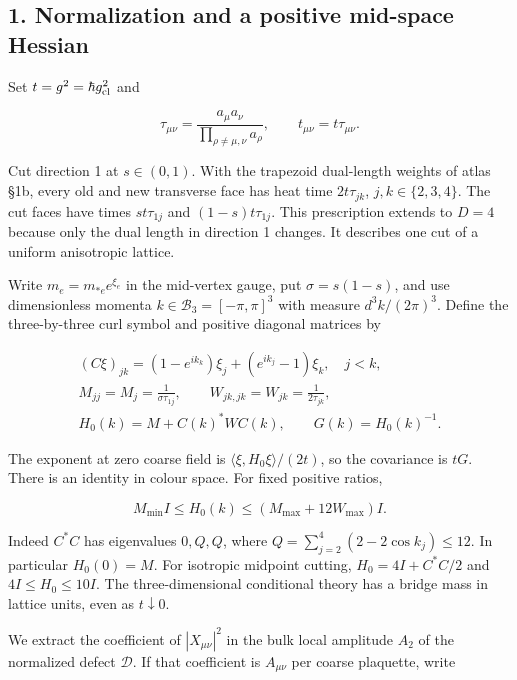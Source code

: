 \documentclass[11pt,a4paper]{article}
\begin{document}
\hypertarget{normalization-and-a-positive-mid-space-hessian}{%
\subsection{1. Normalization and a positive mid-space
Hessian}\label{normalization-and-a-positive-mid-space-hessian}}

Set \(t=g^2=\hbar g_{\rm cl}^2\) and

\[\tau_{\mu\nu}=\frac{a_\mu a_\nu}
 {\prod_{\rho\ne\mu,\nu}a_\rho},\qquad
 t_{\mu\nu}=t\tau_{\mu\nu}.\]

Cut direction 1 at \(s\in(0,1)\). With the trapezoid dual-length weights
of atlas §1b, every old and new transverse face has heat time
\(2t\tau_{jk}\), \(j,k\in\{2,3,4\}\). The cut faces have times
\(st\tau_{1j}\) and \((1-s)t\tau_{1j}\). This prescription extends to
\(D=4\) because only the dual length in direction 1 changes. It
describes one cut of a uniform anisotropic lattice.

Write \(m_e=m_{*e}e^{\xi_e}\) in the mid-vertex gauge, put
\(\sigma=s(1-s)\), and use dimensionless momenta
\(k\in\mathcal B_3=[-\pi,\pi]^3\) with measure \(d^3k/(2\pi)^3\). Define
the three-by-three curl symbol and positive diagonal matrices by

\[\begin{gathered}
 (C\xi)_{jk}=(1-e^{ik_k})\xi_j+(e^{ik_j}-1)\xi_k,\quad j<k,\\
 M_{jj}=M_j=\frac1{\sigma\tau_{1j}},\qquad
 W_{jk,jk}=W_{jk}=\frac1{2\tau_{jk}},\\
 H_0(k)=M+C(k)^*WC(k),\qquad G(k)=H_0(k)^{-1}.
\end{gathered}\tag{2}\]

The exponent at zero coarse field is \(\langle\xi,H_0\xi\rangle/(2t)\),
so the covariance is \(tG\). There is an identity in colour space. For
fixed positive ratios,

\[M_{\min}I\le H_0(k)\le(M_{\max}+12W_{\max})I.\tag{3}\]

Indeed \(C^*C\) has eigenvalues \(0,Q,Q\), where
\(Q=\sum_{j=2}^4(2-2\cos k_j)\le12\). In particular \(H_0(0)=M\). For
isotropic midpoint cutting, \(H_0=4I+C^*C/2\) and \(4I\le H_0\le10I\).
The three-dimensional conditional theory has a bridge mass in lattice
units, even as \(t\downarrow0\).

We extract the coefficient of \(|X_{\mu\nu}|^2\) in the bulk local
amplitude \(A_2\) of the normalized defect \(\mathcal D\). If that
coefficient is \(A_{\mu\nu}\) per coarse plaquette, write
\end{document}
